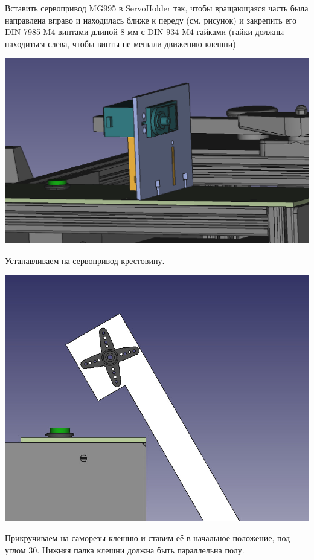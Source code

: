 \documentclass[12pt,a4paper,oneside]{article}
\begin{document}
Вставить сервопривод MG995 в ServoHolder так, чтобы вращающаяся часть была
направлена вправо и находилась ближе к переду (см. рисунок) и закрепить его
DIN-7985-M4 винтами длиной 8 мм с DIN-934-M4 гайками (гайки должны находиться слева, чтобы
винты не мешали движению клешни)

\includegraphics[width=\textwidth]{installedservo}

Устанавливаем на сервопривод крестовину. 

\includegraphics[width=\textwidth]{servo.png}

Прикручиваем на саморезы клешню и ставим её в начальное положение, под углом 30.
Нижняя палка клешни должна быть  параллельна полу. 
\end{document}
